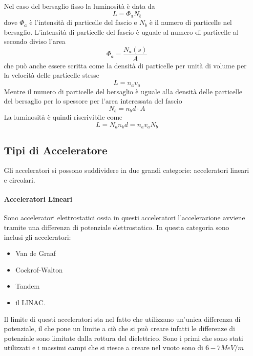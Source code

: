 Nel caso del bersaglio fisso la luminosità è data da
\begin{equation}
L=\Phi_a N_b
\end{equation}
dove $\Phi_a$ è l'intensità di particelle del fascio e $N_b$ è il numero di particelle nel bersaglio.
L'intensità di particelle del fascio è uguale al numero di particelle al secondo diviso l'area
\begin{equation}
\Phi_a=\frac{N_a(s)}{A}
\end{equation}
che può anche essere scritta come la densità di particelle per unità di volume per la velocità delle particelle stesse
\begin{equation}
L=n_a v_a
\end{equation}
Mentre il numero di particelle del bersaglio è uguale alla densità delle particelle del bersaglio per lo spessore per l'area interessata del fascio
\begin{equation}
N_b=n_bd\cdot A
\end{equation}
La luminosità è quindi riscrivibile come
\begin{equation}
L=N_an_bd=n_av_aN_b
\end{equation}

\subsection{Tipi di Acceleratore}
Gli acceleratori si possono suddividere in due grandi categorie: acceleratori lineari e circolari.
\paragraph{Acceleratori Lineari}
Sono acceleratori elettrostatici ossia in questi acceleratori l'accelerazione avviene tramite una differenza di potenziale elettrostatico. 
In questa categoria sono inclusi gli acceleratori: 
\begin{itemize}
\item Van de Graaf
\item Cockrof-Walton
\item Tandem
\item il LINAC.
\end{itemize}
Il limite di questi acceleratori sta nel fatto che utilizzano un'unica differenza di potenziale, il che pone un limite a ciò che si può creare infatti le differenze di potenziale sono limitate dalla rottura del dielettrico.
Sono i primi che sono stati utilizzati e i massimi campi che si riesce a creare nel vuoto sono di $6-7MeV/m$

